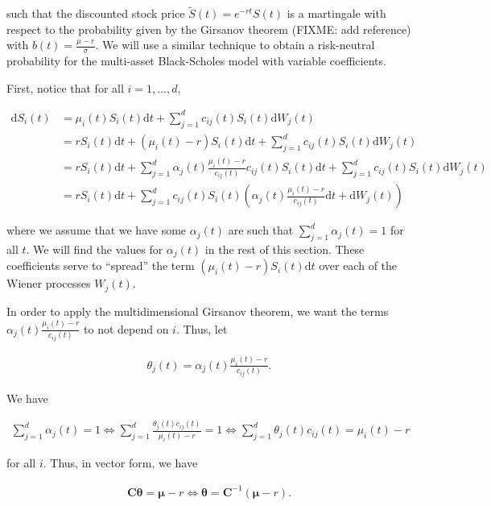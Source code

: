 \documentclass[a4paper]{article}
\begin{document}
such that the discounted stock price $\tilde{S}(t) = e^{-rt}S(t)$ is a martingale with respect to the probability given by the Girsanov theorem (FIXME: add reference) with $b(t) = \frac{\mu - r}{\sigma}$. We will use a similar technique to obtain a risk-neutral probability for the multi-asset Black-Scholes model with variable coefficients.

First, notice that for all $i=1,\ldots,d$,

\begin{align*}
  \mathrm{d}S_i(t)
  &= \mu_i(t) S_i(t) \mathrm{d}t + \sum_{j=1}^{d} c_{ij}(t) S_i(t) \mathrm{d}W_j(t)\\
  &= r S_i(t) \mathrm{d}t + (\mu_i(t) - r) S_i(t) \mathrm{d}t + \sum_{j=1}^{d} c_{ij}(t) S_i(t) \mathrm{d}W_j(t)\\
  &= r S_i(t) \mathrm{d}t + \sum_{j=1}^{d} \alpha_j(t) \frac{\mu_i(t) - r}{c_{ij}(t)} c_{ij}(t) S_i(t) \mathrm{d}t + \sum_{j=1}^{d} c_{ij}(t) S_i(t) \mathrm{d}W_j(t)\\
  &= r S_i(t) \mathrm{d}t + \sum_{j=1}^{d} c_{ij}(t) S_i(t) \left(\alpha_j(t) \frac{\mu_i(t) - r}{c_{ij}(t)} \mathrm{d}t + \mathrm{d}W_j(t)\right)
\end{align*}

where we assume that we have some $\alpha_j(t)$ are such that $\sum_{j=1}^d \alpha_j(t) = 1$ for all $t$. We will find the values for $\alpha_j(t)$ in the rest of this section. These coefficients serve to ``spread'' the term $(\mu_i(t) - r) S_i(t) \mathrm{d}t$ over each of the Wiener processes $W_j(t)$.

In order to apply the multidimensional Girsanov theorem, we want the terms $\alpha_j(t) \frac{\mu_i(t) - r}{c_{ij}(t)}$ to not depend on $i$. Thus, let

\begin{align*}
  \theta_j(t) = \alpha_j(t) \frac{\mu_i(t) - r}{c_{ij}(t)}.
\end{align*}

We have

\begin{align*}
  \sum_{j=1}^{d} \alpha_j(t) = 1
  \iff \sum_{j=1}^{d} \frac{\theta_j(t) c_{ij}(t)}{\mu_i(t) - r} = 1
  \iff \sum_{j=1}^{d} \theta_j(t) c_{ij}(t) = \mu_i(t) - r
\end{align*}

for all $i$. Thus, in vector form, we have

\begin{align*}
  \mathbf{C} \mathbf{\theta} = \mathbf{\mu} - r
  \iff \mathbf{\theta} = \mathbf{C}^{-1} (\mathbf{\mu} - r).
\end{align*}
\end{document}
